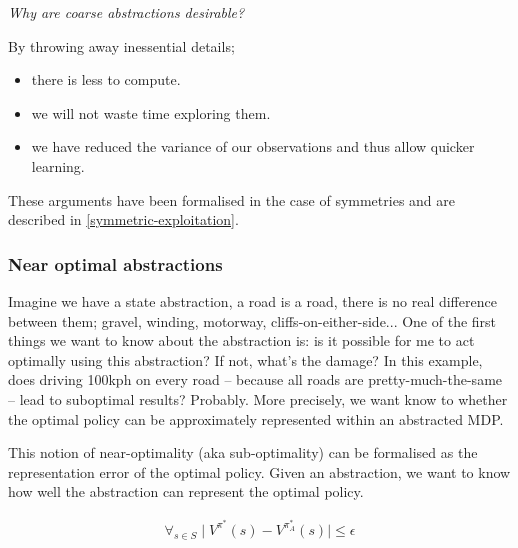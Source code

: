 
\begin{displayquote}
\textsl{Why are coarse abstractions desirable?}
\end{displayquote}

By throwing away inessential details;
\begin{itemize}
  \tightlist
  \item there is less to compute.
  \item we will not waste time exploring them.
  \item we have reduced the variance of our observations and thus allow quicker learning.
\end{itemize}

These arguments have been formalised in the case of symmetries and are described in \ref{symmetric-exploitation}.


\subsubsection{Near optimal abstractions}\label{near-optimal-abstraction}

Imagine we have a state abstraction, a road is a road, there is no real difference
between them; gravel, winding, motorway, cliffs-on-either-side...
One of the first things we want to know about the abstraction is:
is it possible for me to act optimally
using this abstraction? If not, what's the damage? In this example, does driving 100kph on every road --
because all roads are pretty-much-the-same -- lead to suboptimal results? Probably.
More precisely, we want know to whether the optimal policy can be approximately represented within an abstracted MDP.

This notion of near-optimality (aka sub-optimality) can be formalised as the representation error of the optimal
policy. \cite{Abel2017} Given an abstraction, we want to know how well the abstraction can represent the optimal policy.

\begin{align}
\forall_{s\in S} \mid V^{\pi^* }(s) - V^{\pi_{A}^* }(s) \mid \le \epsilon
\end{align}

